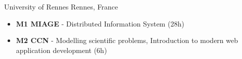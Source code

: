 {University of Rennes }{Rennes, France}
{\begin{itemize}
    \item \textbf{M1 MIAGE} - Distributed Information System (28h)
    \item \textbf{M2 CCN} - Modelling scientific problems, Introduction to modern web application development (6h) 
\end{itemize}}
